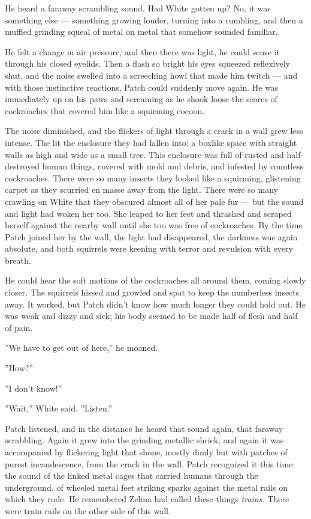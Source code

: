 \documentclass[12pt]{book}
\begin{document}
He heard a faraway scrambling sound. Had White gotten up? No, it was
something else --- something growing louder, turning into a rumbling,
and then a muffled grinding squeal of metal on metal that somehow
sounded familiar.

He felt a change in air pressure, and then there was light, he could
sense it through his closed eyelids. Then a flash so bright his eyes
squeezed reflexively shut, and the noise swelled into a screeching
howl that made him twitch --- and with those instinctive reactions,
Patch could suddenly move again. He was immediately up on his paws and
screaming as he shook loose the scores of cockroaches that covered him
like a squirming cocoon.

The noise diminished, and the flickers of light through a crack in a
wall grew less intense. The lit the enclosure they had fallen into: a
boxlike space with straight walls as high and wide as a small
tree. This enclosure was full of rusted and half-destroyed human
things, covered with mold and debris, and infested by countless
cockroaches. There were so many insects they looked like a squirming,
glistening carpet as they scurried en masse away from the light. There
were so many crawling on White that they obscured almost all of her
pale fur --- but the sound and light had woken her too. She leaped to
her feet and thrashed and scraped herself against the nearby wall
until she too was free of cockroaches. By the time Patch joined her by
the wall, the light had disappeared, the darkness was again absolute,
and both squirrels were keening with terror and revulsion with every
breath.

He could hear the soft motions of the cockroaches all around them,
coming slowly closer. The squirrels hissed and growled and spat to
keep the numberless insects away. It worked, but Patch didn't know how
much longer they could hold out. He was weak and dizzy and sick; his
body seemed to be made half of flesh and half of pain.

''We have to get out of here,'' he moaned.

''How?''

''I don't know!''

''Wait,'' White said. ''Listen.''

Patch listened, and in the distance he heard that sound again, that
faraway scrabbling. Again it grew into the grinding metallic shriek,
and again it was accompanied by flickering light that shone, mostly
dimly but with patches of purest incandescence, from the crack in the
wall. Patch recognized it this time: the sound of the linked metal
cages that carried humans through the underground, of wheeled metal
feet striking sparks against the metal rails on which they rode. He
remembered Zelina had called these things \textit{trains.} There were
train rails on the other side of this wall.
\end{document}
